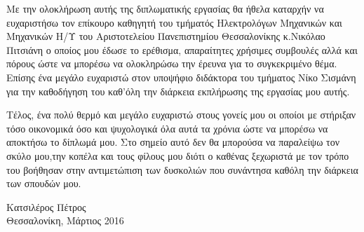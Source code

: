 
\cleardoublepage


\begin{acknowledgements}

\par Με την ολοκλήρωση αυτής της διπλωματικής εργασίας θα ήθελα καταρχήν να ευχαριστήσω τον επίκουρο καθηγητή του τμήματός Ηλεκτρολόγων Μηχανικών και Μηχανικών Η/Υ του Αριστοτελείου Πανεπιστημίου Θεσσαλονίκης κ.Νικόλαο Πιτσιάνη ο οποίος μου έδωσε το ερέθισμα, απαραίτητες χρήσιμες συμβουλές αλλά και πόρους ώστε να μπορέσω να ολοκληρώσω την έρευνα για το συγκεκριμένο θέμα. Επίσης ένα μεγάλο ευχαριστώ στον υποψήφιο διδάκτορα του τμήματος Νίκο Σισμάνη για την καθοδήγηση του καθ'όλη την διάρκεια εκπλήρωσης της εργασίας μου αυτής. 

\par Τέλος, ένα πολύ θερμό και μεγάλο ευχαριστώ στους γονείς μου οι οποίοι με στήριξαν τόσο οικονομικά όσο και ψυχολογικά όλα αυτά τα χρόνια ώστε να μπορέσω να αποκτήσω το δίπλωμά μου. Στο σημείο αυτό δεν θα μπορούσα να παραλείψω τον σκύλο μου,την κοπέλα και τους φίλους μου διότι ο καθένας ξεχωριστά με τον τρόπο του βοήθησαν στην αντιμετώπιση των δυσκολιών που συνάντησα καθόλη την διάρκεια των σπουδών μου.

\begin{flushright}
Κατσιλέρος Πέτρος \\
Θεσσαλονίκη, Μάρτιος 2016
\end{flushright}

\end{acknowledgements}
